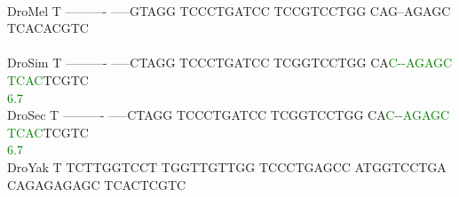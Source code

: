 \documentclass[11pt,twoside,reqno,a4paper]{article}
\begin{document}
{\\
DroMel	T	----------	-----GTAGG	TCCCTGATCC	TCCGTCCTGG	CAG--AGAGC	TCACACGTC\\
\hspace*{7\charwidth}\hspace*{1\charwidth}\hspace*{1\charwidth}\hspace*{1\charwidth}\hspace*{1\charwidth}\hspace*{1\charwidth}\hspace*{1\charwidth}\\
DroSim	T	----------	-----CTAGG	TCCCTGATCC	TCGGTCCTGG	CA\textcolor{Green}{C}\textcolor{Green}{-}\textcolor{Green}{-}\textcolor{Green}{A}\textcolor{Green}{G}\textcolor{Green}{A}\textcolor{Green}{G}\textcolor{Green}{C}	\textcolor{Green}{T}\textcolor{Green}{C}\textcolor{Green}{A}\textcolor{Green}{C}TCGTC\\
\hspace*{7\charwidth}\hspace*{1\charwidth}\hspace*{1\charwidth}\hspace*{1\charwidth}\hspace*{1\charwidth}\hspace*{1\charwidth}\hspace*{43\charwidth}\textcolor{Green}{6.7}\hspace*{1\charwidth}\\
DroSec	T	----------	-----CTAGG	TCCCTGATCC	TCGGTCCTGG	CA\textcolor{Green}{C}\textcolor{Green}{-}\textcolor{Green}{-}\textcolor{Green}{A}\textcolor{Green}{G}\textcolor{Green}{A}\textcolor{Green}{G}\textcolor{Green}{C}	\textcolor{Green}{T}\textcolor{Green}{C}\textcolor{Green}{A}\textcolor{Green}{C}TCGTC\\
\hspace*{7\charwidth}\hspace*{1\charwidth}\hspace*{1\charwidth}\hspace*{1\charwidth}\hspace*{1\charwidth}\hspace*{1\charwidth}\hspace*{43\charwidth}\textcolor{Green}{6.7}\hspace*{1\charwidth}\\
DroYak	T	TCTTGGTCCT	TGGTTGTTGG	TCCCTGAGCC	ATGGTCCTGA	CAGAGAGAGC	TCACTCGTC\\
\hspace*{7\charwidth}\hspace*{1\charwidth}\hspace*{1\charwidth}\hspace*{1\charwidth}\hspace*{1\charwidth}\hspace*{1\charwidth}\hspace*{1\charwidth}\\
}
\end{document}
